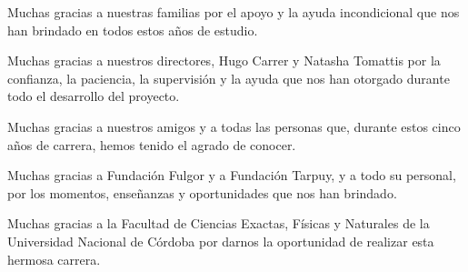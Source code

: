 \documentclass[
11pt, %
spanish, %
singlespacing, %
headsepline, %
]{MastersDoctoralThesis} %
\begin{document}

 
\begin{acknowledgements}
	
	Muchas gracias a nuestras familias por el apoyo y la ayuda incondicional que
  nos han brindado en todos estos años de estudio. \bigskip
			
	
	Muchas gracias a nuestros directores, Hugo Carrer y Natasha Tomattis por la
  confianza, la paciencia, la supervisión y la ayuda que nos han otorgado
  durante todo el desarrollo del proyecto. \bigskip
			
	
	Muchas gracias a nuestros amigos y a todas las personas que, durante estos
  cinco años de carrera, hemos tenido el agrado de conocer. \bigskip
		
	
	Muchas gracias a Fundación Fulgor y a Fundación Tarpuy, y a todo su personal,
  por los momentos, enseñanzas y oportunidades que nos han brindado. \bigskip
			
	
	Muchas gracias a la Facultad de Ciencias Exactas, Físicas y Naturales de la
  Universidad Nacional de Córdoba por darnos la oportunidad de realizar esta
  hermosa carrera. \vspace*{\fill}
		
\end{acknowledgements}


\hypersetup{
	linkcolor=black,
	citecolor=black,
	urlcolor=black
	}

\tableofcontents %

\listoffigures %

\listoftables %

\lstlistoflistings

\end{document}

